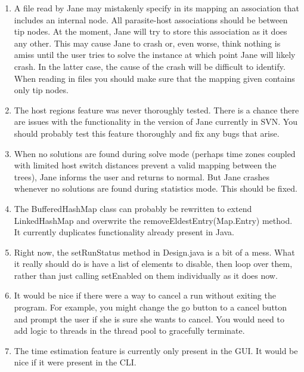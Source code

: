 \documentclass{article}
\begin{document}
\begin{enumerate}

\item A file read by Jane may mistakenly specify in its mapping an association that includes an internal node. All parasite-host associations should be between tip nodes. At the moment, Jane will try to store this association as it does any other. This may cause Jane to crash or, even worse, think nothing is amiss until the user tries to solve the instance at which point Jane will likely crash. In the latter case, the cause of the crash will be difficult to identify. When reading in files you should make sure that the mapping given contains only tip nodes. 

\item The host regions feature was never thoroughly tested. There is a chance there are issues with the functionality in the version of Jane currently in SVN. You should probably test this feature thoroughly and fix any bugs that arise.

\item When no solutions are found during solve mode (perhaps time zones coupled with limited host switch distances prevent a valid mapping between the trees), Jane informs the user and returns to normal. But Jane crashes whenever no solutions are found during statistics mode. This should be fixed.

\item The BufferedHashMap class can probably be rewritten to extend LinkedHashMap and overwrite the removeEldestEntry(Map.Entry) method. It currently duplicates functionality already present in Java. 

\item Right now, the setRunStatus method in Design.java is a bit of a mess. What it really should do is have a list of elements to disable, then loop over them, rather than just calling setEnabled on them individually as it does now.

\item It would be nice if there were a way to cancel a run without exiting the program. For example, you might change the go button to a cancel button and prompt the user if she is sure she wants to cancel. You would need to add logic to threads in the thread pool to gracefully terminate.

\item The time estimation feature is currently only present in the GUI. It would be nice if it were present in the CLI.


\end{enumerate}
\end{document}
